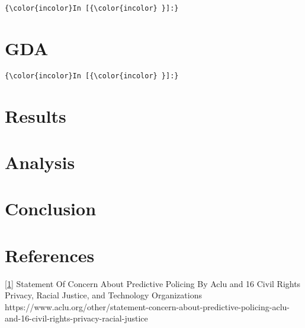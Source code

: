 \documentclass[11pt]{article}
\begin{document}
    \begin{Verbatim}[commandchars=\\\{\}]
{\color{incolor}In [{\color{incolor} }]:} 
\end{Verbatim}

    \hypertarget{gda}{%
\section{GDA}\label{gda}}

    \begin{Verbatim}[commandchars=\\\{\}]
{\color{incolor}In [{\color{incolor} }]:} 
\end{Verbatim}

    \hypertarget{results}{%
\section{Results}\label{results}}

\hypertarget{analysis}{%
\section{Analysis}\label{analysis}}

\hypertarget{conclusion}{%
\section{Conclusion}\label{conclusion}}

    \hypertarget{references}{%
\section{References}\label{references}}

\href{https://www.aclu.org/other/statement-concern-about-predictive-policing-aclu-and-16-civil-rights-privacy-racial-justice}{{[}1{]}}
Statement Of Concern About Predictive Policing By Aclu and 16 Civil
Rights Privacy, Racial Justice, and Technology Organizations
https://www.aclu.org/other/statement-concern-about-predictive-policing-aclu-and-16-civil-rights-privacy-racial-justice


    
    
    
    
\end{document}
